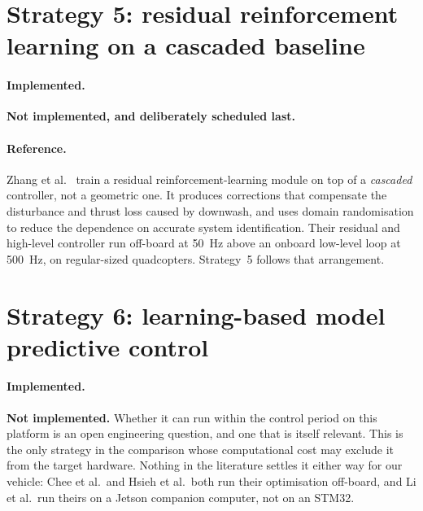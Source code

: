 \section{Strategy 5: residual reinforcement learning on a cascaded baseline}
\label{sec:ctrl-s5}

\paragraph{Implemented.} \textbf{Not implemented, and deliberately scheduled last.}

\paragraph{Reference.} Zhang et al.~\cite{zhang2024proxfly} train a residual reinforcement-learning
module on top of a \emph{cascaded} controller, not a geometric one. It produces corrections that
compensate the disturbance and thrust loss caused by downwash, and uses domain randomisation to
reduce the dependence on accurate system identification. Their residual and high-level controller
run off-board at \SI{50}{\hertz} above an onboard low-level loop at \SI{500}{\hertz}, on
regular-sized quadcopters. Strategy~5 follows that arrangement.

\section{Strategy 6: learning-based model predictive control}
\label{sec:ctrl-s6}

\paragraph{Implemented.} \textbf{Not implemented.} Whether it can run within the control period on
this platform is an open engineering question, and one that is itself relevant. This is the only
strategy in the comparison whose computational cost may exclude it from the target hardware. Nothing
in the literature settles it either way for our vehicle: Chee et al.\ and Hsieh et al.\ both run
their optimisation off-board, and Li et al.\ run theirs on a Jetson companion computer, not on an
STM32.

